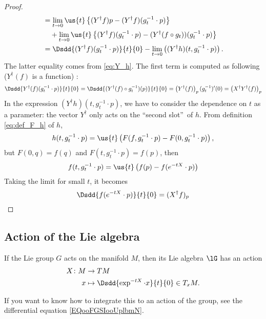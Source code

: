 \begin{proof}
\begin{equation}
\begin{aligned}
                     &=\lim_{t\to 0}\us{t}\left\{ (Y^{\dag} f)p-(Y^{\dag} f)(g_t^{-1}\cdot p) \right\}\\
		     &\quad+\lim_{t\to 0}\us{t}\left\{ (Y^{\dag} f)(g_t^{-1}\cdot p)
		                                      -(Y^{\dag}(f\circ g_t) )(g_t^{-1}\cdot p)
					       \right\}\\
   &=\Dsdd{ (Y^{\dag} f)(g_t^{-1}\cdot p) }{t}{0}-\lim_{t\to 0} 
                \left(    (Y^{\dag} h)(t,g_t^{-1}\cdot p)       \right).
\end{aligned}
\end{equation}
The latter equality comes from  \eqref{eq:Y_h}. The first term is computed as following ($Y^{\dag}(f)$ is a function) :
\begin{equation}
\Dsdd{ Y^{\dag}(f)(g_t^{-1}\cdot p) }{t}{0}=\Dsdd{ (Y^{\dag}(f)\circ g_t^{-1})(p) }{t}{0}
                                        =\left( Y^{\dag}(f) \right)_p(g_t^{-1})'(0)
					=\left( X^{\dag} Y^{\dag}(f)\right)_p
\end{equation}
In the expression $(Y^{\dag} h)(t,g_t^{-1}\cdot p)$, we have to consider the dependence on $t$ as a parameter: the vector $Y^{\dag}$ only acts on the ``second slot''\ of $h$. From definition \eqref{eq:def_F_h} of $h$,
\[
   h(t,g_t^{-1}\cdot p)=\us{t}\left(  F(f,g_t^{-1}\cdot p)-F(0,g_t^{-1}\cdot p)  
                             \right),
\]
but $F(0,q)=f(q)$ and $F(t,g_t^{-1}\cdot p)=f(p)$, then
\[
  f(t,g_t^{-1}\cdot p)=\us{t}\left( f(p)-f(e^{-tX}\cdot p) \right)
\]
Taking the limit for small $t$, it becomes 
\[
  \Dsdd{f(e^{-tX}\cdot p)}{t}{0}=(X^{\dag} f)_p
\]

\end{proof}

\subsection{Action of the Lie algebra}

\begin{definition}       \label{DEFooUYOZooWdcClz}
    If the Lie group \( G\) acts on the manifold \( M\), then its Lie algebra \( \lG\) has an action
    \begin{equation}
        \begin{aligned}
            X\colon M&\to TM \\
            x&\mapsto \Dsdd{  \exp^{-tX}\cdot x }{t}{0}\in T_xM.
        \end{aligned}
    \end{equation}
\end{definition}
If you want to know how to integrate this to an action of the group, see the differential equation \eqref{EQooFGSIooUplbmN}.

